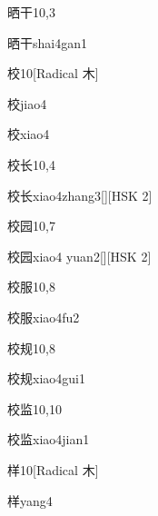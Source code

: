 \begin{entry}{晒干}{10,3}
  \begin{phonetics}{晒干}{shai4gan1}
  \end{phonetics}
\end{entry}

\begin{entry}{校}{10}[Radical 木]
  \begin{phonetics}{校}{jiao4}
  \end{phonetics}
  \begin{phonetics}{校}{xiao4}
  \end{phonetics}
\end{entry}

\begin{entry}{校长}{10,4}
  \begin{phonetics}{校长}{xiao4zhang3}[][HSK 2]
  \end{phonetics}
\end{entry}

\begin{entry}{校园}{10,7}
  \begin{phonetics}{校园}{xiao4 yuan2}[][HSK 2]
  \end{phonetics}
\end{entry}

\begin{entry}{校服}{10,8}
  \begin{phonetics}{校服}{xiao4fu2}
  \end{phonetics}
\end{entry}

\begin{entry}{校规}{10,8}
  \begin{phonetics}{校规}{xiao4gui1}
  \end{phonetics}
\end{entry}

\begin{entry}{校监}{10,10}
  \begin{phonetics}{校监}{xiao4jian1}
  \end{phonetics}
\end{entry}

\begin{entry}{样}{10}[Radical 木]
  \begin{phonetics}{样}{yang4}
  \end{phonetics}
\end{entry}

